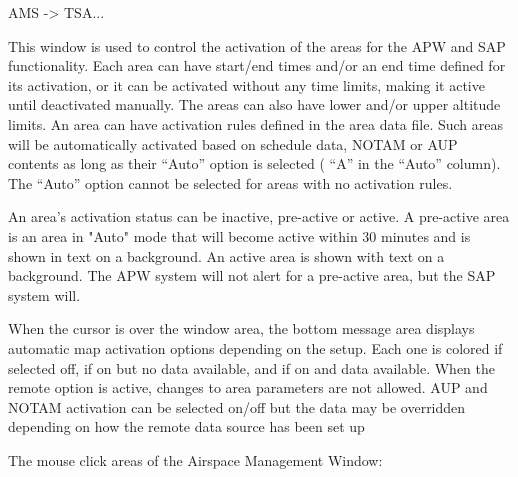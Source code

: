 \documentclass[a4paper,oneside,11pt]{memoir}
\begin{document}
 AMS -> TSA...

\bigskip


This window is used to control the activation of the areas for the APW and SAP functionality. Each area can have start/end times and/or an end time defined for its activation, or it can be activated without any time limits, making it active until deactivated manually. The areas can also have lower and/or upper altitude limits. An area can have activation rules defined in the area data file. Such areas will be automatically activated based on schedule data, NOTAM or AUP contents as long as their “Auto” option is selected ( “A” in the “Auto” column). The “Auto” option cannot be selected for areas with no activation rules.

\bigskip

An area’s activation status can be inactive, pre-active or active. A pre-active area is an area in "Auto" mode that will become active within 30 minutes and is shown in  text on a  background. An active area is shown with  text on a  background. The APW system will not alert for a pre-active area, but the SAP system will.

\bigskip

When the cursor is over the window area, the bottom message area displays automatic map activation options depending on the setup. Each one is colored  if selected off,  if on but no data available, and  if on and data available. When the remote option is active, changes to area parameters are not allowed. AUP and NOTAM activation can be selected on/off but the data may be overridden depending on how the remote data source has been set up

\bigskip

The mouse click areas of the Airspace Management Window:
\end{document}
